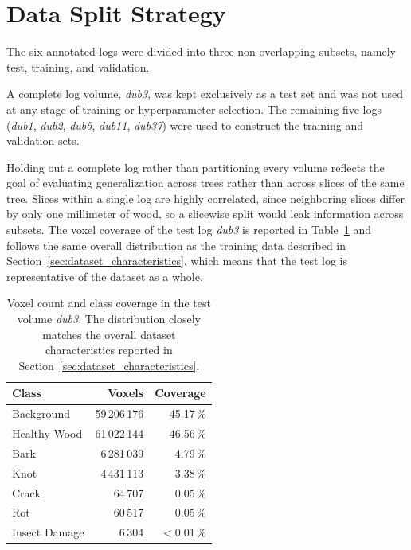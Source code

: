\section{Data Split Strategy}

The six annotated logs were divided into three non-overlapping subsets, namely test, training, and validation.

A complete log volume, \textit{dub3}, was kept exclusively as a test set and was not used at any stage of training or hyperparameter selection. The remaining five logs (\textit{dub1}, \textit{dub2}, \textit{dub5}, \textit{dub11}, \textit{dub37}) were used to construct the training and validation sets.

Holding out a complete log rather than partitioning every volume reflects the goal of evaluating generalization across trees rather than across slices of the same tree. Slices within a single log are highly correlated, since neighboring slices differ by only one millimeter of wood, so a slicewise split would leak information across subsets. The voxel coverage of the test log \textit{dub3} is reported in Table~\ref{tab:test_coverage} and follows the same overall distribution as the training data described in Section~\ref{sec:dataset_characteristics}, which means that the test log is representative of the dataset as a whole.

\begin{table}[htbp]
    \centering
    \caption{Voxel count and class coverage in the test volume \textit{dub3}. The distribution closely matches the overall dataset characteristics reported in Section~\ref{sec:dataset_characteristics}.}
    \label{tab:test_coverage}
    \begin{tabular}{lrr}
        \toprule
        \textbf{Class} & \textbf{Voxels} & \textbf{Coverage} \\
        \midrule
        Background     & 59\,206\,176 & 45.17\,\% \\
        Healthy Wood   & 61\,022\,144 & 46.56\,\% \\
        Bark           &  6\,281\,039 &  4.79\,\% \\
        Knot           &  4\,431\,113 &  3.38\,\% \\
        Crack          &      64\,707 &  0.05\,\% \\
        Rot            &      60\,517 &  0.05\,\% \\
        Insect Damage  &       6\,304 &  $<$0.01\,\% \\
        \bottomrule
    \end{tabular}
\end{table}

